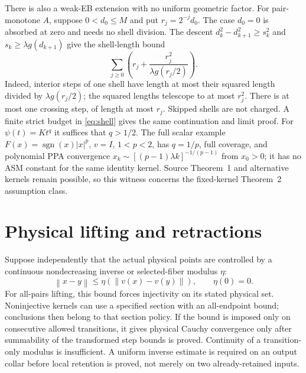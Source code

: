 \documentclass[11pt]{article}
\newcommand{\norm}[1]{\left\lVert#1\right\rVert}
\theoremstyle{remark}
\begin{document}
There is also a weak-EB extension with no uniform geometric factor.
For pair-monotone $A$, suppose $0<d_0\le M$ and put $r_j=2^{-j}d_0$.
The case $d_0=0$ is absorbed at zero and needs no shell division.
The descent $d_k^2-d_{k+1}^2\ge s_k^2$ and
$s_k\ge\lambda g(d_{k+1})$ give the shell-length bound
\begin{equation}\label{eq:shell}
 \sum_{j\ge0}\left(r_j+\frac{r_j^2}{\lambda g(r_j/2)}\right).
\end{equation}
Indeed, interior steps of one shell have length at most their squared
length divided by $\lambda g(r_j/2)$; the squared lengths telescope
to at most $r_j^2$. There is at most one crossing step, of length at
most $r_j$. Skipped shells are not charged. A finite strict budget
in \eqref{eq:shell} gives the same continuation and limit proof.
For $\psi(t)=Kt^q$ it suffices that $q>1/2$.
The full scalar example $F(x)=\operatorname{sgn}(x)|x|^p$, $v=I$,
$1<p<2$, has $q=1/p$, full coverage, and polynomial PPA convergence
$x_k\sim[(p-1)\lambda k]^{-1/(p-1)}$ from $x_0>0$; it has no ASM
constant for the same identity kernel. Source Theorem~1 and alternative
kernels remain possible, so this witness concerns the fixed-kernel
Theorem~2 assumption class.

\section{Physical lifting and retractions}
Suppose independently that the actual physical points are controlled by
a continuous nondecreasing inverse or selected-fiber modulus $\eta$:
\begin{equation}\label{eq:lift}
 \norm{x-y}\le\eta(\norm{v(x)-v(y)}),\qquad\eta(0)=0.
\end{equation}
For all-pairs lifting, this bound forces injectivity on its stated
physical set. Noninjective kernels can use a specified section with an
all-endpoint bound; conclusions then belong to that section policy.
If the bound is imposed only on consecutive allowed transitions, it gives
physical Cauchy convergence only after summability of the transformed
step bounds is proved. Continuity of a transition-only modulus is insufficient.
A uniform inverse estimate is required on an output collar before local
retention is proved, not merely on two already-retained inputs.
\end{document}
